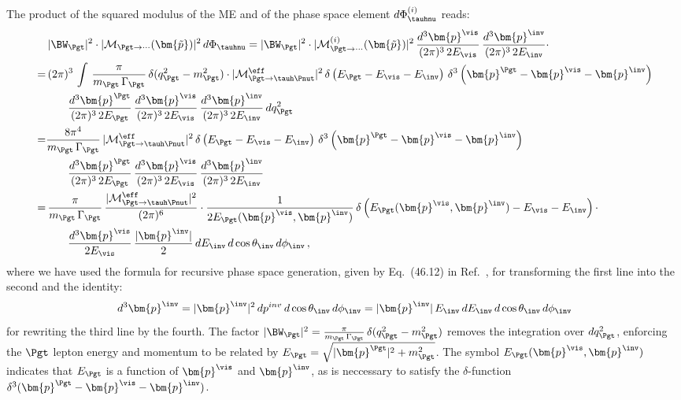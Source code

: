 The product of the squared modulus of the ME and of the phase space
element $d\Phi^{(i)}_{\tauhnu}$ reads:
\begin{align}
 & \, \vert \BW_{\Pgt} \vert^{2} \cdot \vert\mathcal{M}_{\Pgt\to\cdots}(\bm{\tilde{p}})\vert^{2} \,
 d\Phi_{\tauhnu} = \vert \BW_{\Pgt} \vert^{2} \cdot \vert \mathcal{M}^{(i)}_{\Pgt\to\cdots}(\bm{\tilde{p}})
\vert^{2} \, \frac{d^{3}\bm{p}^{\vis}}{(2\pi)^{3} \, 2
   E_{\vis}} \, \frac{d^{3}\bm{p}^{\inv}}{(2\pi)^{3} \, 2 E_{\inv}}
 \cdot \nonumber \\
= & \, (2\pi)^{3} \, \int \, \frac{\pi}{m_{\Pgt} \, \Gamma_{\Pgt}} \,
\delta ( q_{\Pgt}^{2} - m_{\Pgt}^{2} ) \cdot \vert\mathcal{M}^{\eff}_{\Pgt \to
  \tauh\Pnut}\vert^{2} \, \delta \left( E_{\Pgt} - E_{\vis} -
  E_{\inv} \right) \, \delta^{3} \left( \bm{p}^{\Pgt} - \bm{p}^{\vis}
  - \bm{p}^{\inv} \right) \nonumber \\
& \qquad \frac{d^{3}\bm{p}^{\Pgt}}{(2\pi)^{3} \, 2 E_{\Pgt}} \, 
  \frac{d^{3}\bm{p}^{\vis}}{(2\pi)^{3} \, 2E_{\vis}} \, \frac{d^{3}\bm{p}^{\inv}}{(2\pi)^{3} \, 2 E_{\inv}} \, dq^{2}_{\Pgt} \nonumber \\
= & \frac{8\pi^{4}}{m_{\Pgt} \, \Gamma_{\Pgt}} \, \vert\mathcal{M}^{\eff}_{\Pgt \to
  \tauh\Pnut}\vert^{2} \, \delta \left( E_{\Pgt} - E_{\vis} -
  E_{\inv} \right) \, \delta^{3} \left( \bm{p}^{\Pgt} - \bm{p}^{\vis}
  - \bm{p}^{\inv} \right) \nonumber \\
& \qquad \frac{d^{3}\bm{p}^{\Pgt}}{(2\pi)^{3} \, 2 E_{\Pgt}} \, 
  \frac{d^{3}\bm{p}^{\vis}}{(2\pi)^{3} \, 2 E_{\vis}} \, \frac{d^{3}\bm{p}^{\inv}}{(2\pi)^{3} \, 2
    E_{\inv}} \nonumber \\
= & \, \frac{\pi}{m_{\Pgt} \, \Gamma_{\Pgt}} \, \frac{\vert\mathcal{M}^{\eff}_{\Pgt \to
  \tauh\Pnut}\vert^{2}}{(2\pi)^{6}} 
 \cdot \frac{1}{2 E_{\Pgt}(\bm{p}^{\vis}, \bm{p}^{\inv})} \, \delta
 \left( E_{\Pgt}(\bm{p}^{\vis}, \bm{p}^{\inv}) - E_{\vis} - E_{\inv}
 \right) \cdot \nonumber \\
& \qquad
  \frac{d^{3}\bm{p}^{\vis}}{2 E_{\vis}} \, \frac{\vert\bm{p}^{\inv}\vert}{2} \, dE_{\inv} \, d\cos\theta_{\inv} \, d\phi_{\inv} \, ,
\label{eq:hadTauDecaysPSint}
\end{align}
where we have used the formula for recursive phase space generation,
given by Eq.~(46.12) in Ref.~\cite{PDG}, for transforming the first line into the second
and the identity:
\begin{equation} 
d^{3}\bm{p}^{\inv} = \vert\bm{p}^{\inv}\vert^{2} \,
dp^{inv} \, d\cos\theta_{\inv} \, d\phi_{\inv} =
\vert\bm{p}^{\inv}\vert \, E_{\inv} \, dE_{\inv} \, d\cos\theta_{\inv}
\, d\phi_{\inv}
\end{equation} 
for rewriting the third line by the fourth.
The factor $\vert \BW_{\Pgt} \vert^{2} = \frac{\pi}{m_{\Pgt} \,
  \Gamma_{\Pgt}} \, \delta ( q^{2}_{\Pgt} - m^{2}_{\Pgt} )$ removes
the integration over $dq^{2}_{\Pgt}$, enforcing the $\Pgt$ lepton
energy and momentum to be related by $E_{\Pgt} =
\sqrt{\vert\bm{p}^{\Pgt}\vert^{2} + m_{\Pgt}^{2}}$.
The symbol $E_{\Pgt}(\bm{p}^{\vis}, \bm{p}^{\inv})$
indicates that $E_{\Pgt}$ is a function of $\bm{p}^{\vis}$
and $\bm{p}^{\inv}$, as is neccessary to satisfy the $
\delta$-function $\delta^{3} ( \bm{p}^{\Pgt} - \bm{p}^{\vis} - \bm{p}^{\inv} )$.

